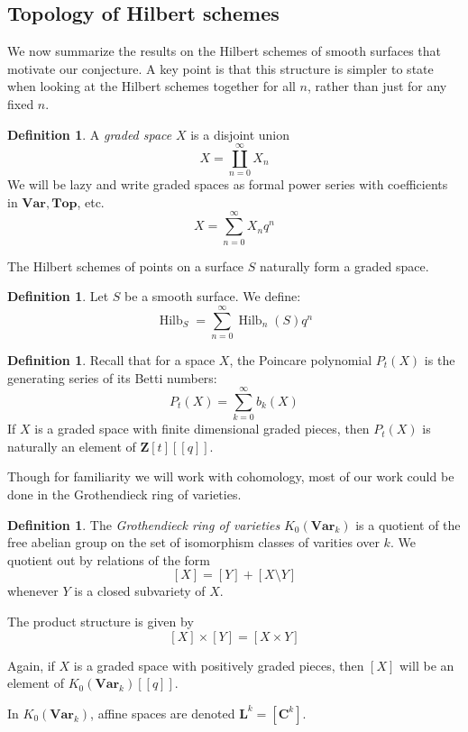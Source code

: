 \documentclass{amsart}[12pt]
\theoremstyle{definition}
\newtheorem{definition}[dummy]{Definition}
\newcommand{\Z}{\mathbf{Z}}
\newcommand{\C}{\mathbf{C}}
\newcommand{\LL}{\mathbf{L}}
\newcommand{\Var}{\mathbf{Var}}
\newcommand{\Top}{\mathbf{Top}}
\DeclareMathOperator{\Hilb}{Hilb}
\newcommand{\HG}{\Hilb}
\begin{document}
\subsection{Topology of Hilbert schemes}


We now summarize the results on the Hilbert schemes of smooth surfaces that motivate our conjecture.  A key point is that this structure is simpler to state when looking at the Hilbert schemes together for all $n$, rather than just for any fixed $n$.  

\begin{definition}
A \emph{graded space} $X$ is a disjoint union $$X=\coprod_{n=0}^\infty X_n$$
We will be lazy and write graded spaces as formal power series with coefficients in $\Var, \Top$, etc.
$$X=\sum_{n=0}^\infty X_nq^n$$
\end{definition}

The Hilbert schemes of points on a surface $S$ naturally form a graded space.

\begin{definition}
Let $S$ be a smooth surface.  We define:
$$\HG_S=\sum_{n=0}^\infty \Hilb_n(S)q^n$$
\end{definition}

\begin{definition}
Recall that for a space $X$, the Poincare polynomial $P_t(X)$ is the generating series of its Betti numbers:
$$P_t(X)=\sum_{k=0}^\infty b_k(X)$$
If $X$ is a graded space with finite dimensional graded pieces, then $P_t(X)$ is naturally an element of $\Z[t][[q]]$.
\end{definition}
 
Though for familiarity we will work with cohomology, most of our work could be done in the Grothendieck ring of varieties.

\begin{definition}
The \emph{Grothendieck ring of varieties} $K_0(\Var_k)$ is a quotient of the free abelian group on the set of isomorphism classes of varities over $k$.  We quotient out by relations of the form
$$[X]=[Y]+[X\setminus Y]$$
whenever $Y$ is a closed subvariety of $X$.   

The product structure is given by
$$[X]\times [Y]=[X\times Y]$$

Again, if $X$ is a graded space with positively graded pieces, then $[X]$ will be an element of $K_0(\Var_k)[[q]]$.

In $K_0(\Var_k)$, affine spaces are denoted $\LL^k=[\C^k]$.

\end{definition}
\end{document}

